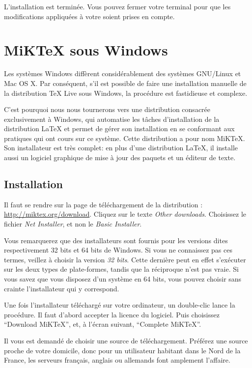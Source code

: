 L'installation est terminée. Vous pouvez fermer votre terminal pour que les modifications appliquées à votre  soient prises en compte. 


\section{MiKTeX sous Windows}


Les systèmes Windows diffèrent considérablement des systèmes GNU/Linux et Mac OS X. Par conséquent, s'il est possible de faire une installation manuelle de la distribution TeX Live sous Windows, la procédure est fastidieuse et complexe.

C'est pourquoi nous nous tournerons vers une distribution consacrée exclusivement à Windows, qui automatise les tâches d'installation de la distribution \LaTeX{} et permet de gérer son installation en se conformant aux pratiques qui ont cours sur ce système. Cette distribution a pour nom MiKTeX. Son installateur est très complet: en plus d'une distribution \LaTeX{}, il installe aussi un logiciel graphique de mise à jour des paquets et un éditeur de texte.

\subsection{Installation}

Il faut se rendre sur la page de téléchargement de la distribution : \url{http://miktex.org/download}. Cliquez sur le texte \emph{Other downloads}. Choisissez le fichier \emph{Net Installer}, et non le \emph{Basic Installer}.

\begin{attention}
Vous remarquerez que des installateurs sont fournis pour les versions dites respectivement 32 bits et 64 bits de Windows. Si vous ne connaissez pas ces termes, veillez à choisir la version \emph{32 bits}. Cette dernière peut en effet s'exécuter sur les deux types de plate-formes, tandis que la réciproque n'est pas vraie. Si vous savez que vous disposez d'un système en 64 bits, vous pouvez choisir sans crainte l'installateur qui y correspond.
\end{attention}

Une fois l'installateur téléchargé sur votre ordinateur, un double-clic lance la procédure. Il faut d'abord accepter la licence du logiciel. Puis choisissez \enquote{Download MiKTeX}, et, à l'écran suivant, \enquote{Complete MiKTeX}.

Il vous est demandé de choisir une source de téléchargement. Préférez une source proche de votre domicile, donc pour un utilisateur habitant dans le Nord de la France, les serveurs français, anglais ou allemands font amplement l'affaire.

